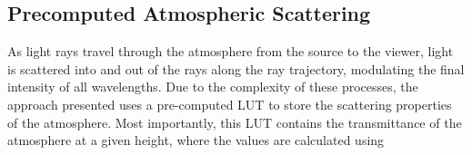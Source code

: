 \documentclass[12pt]{article}
\begin{document}
\subsection{Precomputed Atmospheric Scattering}
As light rays travel through the atmosphere from the source to the viewer, light is scattered into and out of the rays along the ray trajectory, modulating the final intensity of all wavelengths.
Due to the complexity of these processes, the approach presented \cite{bruneton_precomputed_2008} uses a pre-computed LUT to store the scattering properties of the atmosphere.
Most importantly, this LUT contains the transmittance of the atmosphere at a given height, where the values are calculated using

\newpage
\printbibliography
\appendix
\begin{appendices}

\end{appendices}
\end{document}
